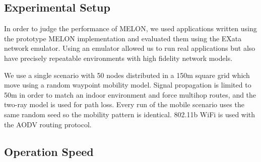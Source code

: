 \documentclass[lnicst]{svmultln}
\begin{document}
\subsection{Experimental Setup}

In order to judge the performance of MELON, we used applications written using the prototype MELON implementation and evaluated them using the EXata network emulator\cite{exata}. Using an emulator allowed us to run real applications but also have precisely repeatable environments with high fidelity network models.

We use a single scenario with 50 nodes distributed in a 150m square grid which move using a random waypoint mobility model. Signal propagation is limited to 50m in order to match an indoor environment and force multihop routes, and the two-ray model is used for path loss. Every run of the mobile scenario uses the same random seed so the mobility pattern is identical. 802.11b WiFi is used with the AODV\cite{aodv} routing protocol.

\subsection{Operation Speed}
\end{document}
